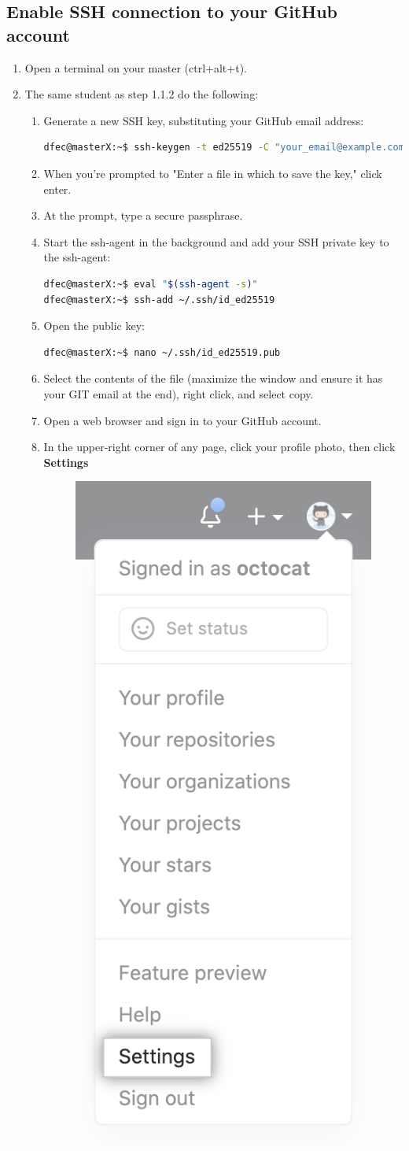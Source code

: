 \documentclass{handout}
\begin{document}
\subsection{Enable SSH connection to your GitHub account}
\begin{enumerate}
	\item Open a terminal on your master (ctrl+alt+t).
	\item The same student as step 1.1.2 do the following:
	\begin{enumerate}
		\item Generate a new SSH key, substituting your GitHub email address:
\begin{lstlisting}[language=bash]
dfec@masterX:~$ ssh-keygen -t ed25519 -C "your_email@example.com"
\end{lstlisting}
		\item When you're prompted to "Enter a file in which to save the key," click enter.
		\item At the prompt, type a secure passphrase.
		\item Start the ssh-agent in the background and add your SSH private key to the ssh-agent:
\begin{lstlisting}[language=bash]
dfec@masterX:~$ eval "$(ssh-agent -s)"
dfec@masterX:~$ ssh-add ~/.ssh/id_ed25519
\end{lstlisting}
		\item Open the public key:
\begin{lstlisting}[language=bash]
dfec@masterX:~$ nano ~/.ssh/id_ed25519.pub
\end{lstlisting}
		\item Select the contents of the file (maximize the window and ensure it has your GIT email at the end), right click, and select copy.
		\item Open a web browser and sign in to your GitHub account.
\newpage
\clearpage
\pagebreak
		\item In the upper-right corner of any page, click your profile photo, then click \textbf{Settings}
		\begin{figure}[H]
			\centering
			\includegraphics[width=.25\textwidth]{userbar-account-settings.PNG}
		\end{figure}


\end{enumerate}
\end{enumerate}
\end{document}
